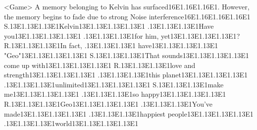 <Game> A memory belonging to Kelvin has surfaced{16}{E1}.{16}{E1}.{16}{E1}. 
However, the memory begins to fade due to strong Noise interference{16}{E1}.{16}{E1}.{16}{E1}.{16}{E1} 
S.{13}{E1}.{13}{E1}.{13}{E1}Kelvin{13}{E1}.{13}{E1}.{13}{E1}.{13}{E1} .{13}{E1}.{13}{E1}.{13}{E1}Have you{13}{E1}.{13}{E1}.{13}{E1}.{13}{E1} .{13}{E1}.{13}{E1}.{13}{E1}for him, yet{13}{E1}.{13}{E1}.{13}{E1}.{13}{E1}? 
R.{13}{E1}.{13}{E1}.{13}{E1}In fact, .{13}{E1}.{13}{E1}.{13}{E1} have{13}{E1}.{13}{E1}.{13}{E1}.{13}{E1} "Geo"{13}{E1}.{13}{E1}.{13}{E1}.{13}{E1} 
S.{13}{E1}.{13}{E1}.{13}{E1}That sounds{13}{E1}.{13}{E1}.{13}{E1}.{13}{E1} come up with{13}{E1}.{13}{E1}.{13}{E1}.{13}{E1} 
R.{13}{E1}.{13}{E1}.{13}{E1}love and strength{13}{E1}.{13}{E1}.{13}{E1}.{13}{E1} .{13}{E1}.{13}{E1}.{13}{E1}this planet{13}{E1}.{13}{E1}.{13}{E1}.{13}{E1} 
.{13}{E1}.{13}{E1}.{13}{E1}unlimited{13}{E1}.{13}{E1}.{13}{E1}.{13}{E1} 
S.{13}{E1}.{13}{E1}.{13}{E1}make me{13}{E1}.{13}{E1}.{13}{E1}.{13}{E1} .{13}{E1}.{13}{E1}.{13}{E1}so happy{13}{E1}.{13}{E1}.{13}{E1}.{13}{E1} 
R.{13}{E1}.{13}{E1}.{13}{E1}Geo{13}{E1}.{13}{E1}.{13}{E1}.{13}{E1} 
.{13}{E1}.{13}{E1}.{13}{E1}You've made{13}{E1}.{13}{E1}.{13}{E1}.{13}{E1} .{13}{E1}.{13}{E1}.{13}{E1}happiest people{13}{E1}.{13}{E1}.{13}{E1}.{13}{E1} .{13}{E1}.{13}{E1}.{13}{E1}world{13}{E1}.{13}{E1}.{13}{E1}.{13}{E1} 
